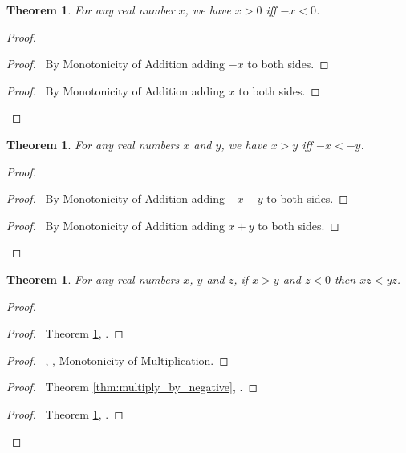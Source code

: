 \documentclass{book}
\let\qed\relax
\newtheorem{thm}[ax]{Theorem}
\theoremstyle{definition}
\begin{document}
\begin{thm}
\label{thm:negation_positive}
For any real number $x$, we have $x > 0$ iff $-x < 0$.
\end{thm}

\begin{proof}
\pf
{}
\begin{proof}
	\pf\ By Monotonicity of Addition adding $-x$ to both sides.
\end{proof}
\begin{proof}
	\pf\ By Monotonicity of Addition adding $x$ to both sides.
\end{proof}
\qed
\end{proof}

\begin{thm}
For any real numbers $x$ and $y$, we have $x > y$ iff $-x < -y$.
\end{thm}

\begin{proof}
\pf
{}
\begin{proof}
	\pf\ By Monotonicity of Addition adding $-x-y$ to both sides.
\end{proof}
\begin{proof}
	\pf\ By Monotonicity of Addition adding $x + y$ to both sides.
\end{proof}
\qed
\end{proof}

\begin{thm}
\label{thm:multiplication_antitone}
For any real numbers $x$, $y$ and $z$, if $x > y$ and $z < 0$ then $xz < yz$.
\end{thm}

\begin{proof}
\pf
{}
\begin{proof}
	\pf\ Theorem \ref{thm:negation_positive}, .
\end{proof}
\begin{proof}
	\pf\ , , Monotonicity of Multiplication.
\end{proof}
\begin{proof}
	\pf\ Theorem \ref{thm:multiply_by_negative}, .
\end{proof}
\begin{proof}
	\pf\ Theorem \ref{thm:negation_positive}, .
\end{proof}
\qed
\end{proof}
\end{document}
